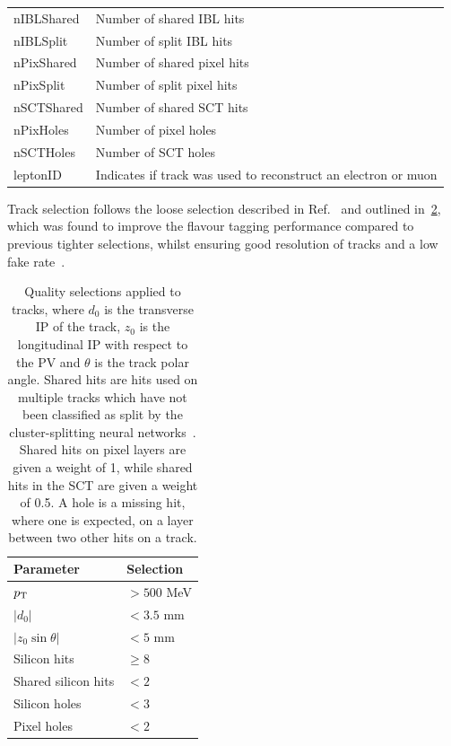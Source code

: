\begin{table}[!htbp]
\begin{tabular}{ll}
    nIBLShared & Number of shared IBL hits \\
    nIBLSplit  & Number of split IBL hits \\
    nPixShared & Number of shared pixel hits \\
    nPixSplit  & Number of split pixel hits \\
    nSCTShared & Number of shared SCT hits \\
    nPixHoles  & Number of pixel holes \\
    nSCTHoles  & Number of SCT holes \\
    leptonID   & Indicates if track was used to reconstruct an electron or muon \\
    \bottomrule
  \end{tabular}
  \vspace{4mm}
  \label{tab:track_inputs}
\end{table}


Track selection follows the loose selection described in Ref.~\cite{ATL-PHYS-PUB-2020-014} and outlined in~\cref{tab:track_selections}, which was found to improve the flavour tagging performance compared to previous tighter selections, whilst ensuring good resolution of tracks and a low fake rate~\cite{PERF-2015-08}.

\begin{table}[!htbp]
  \footnotesize\centering
  \setlength{\tabcolsep}{0.5em} %
  \begin{tabular}{ll}
    \toprule 
    \textbf{Parameter} & \textbf{Selection} \\
    \hline
    $p_{\text{T}}$                & $> 500$ MeV \\
    $|d_0|$              & $< 3.5$ mm \\
    $|z_0 \sin\theta|$   & $< 5$ mm \\
    Silicon hits         & $\ge 8$ \\
    Shared silicon hits  & $< 2$ \\
    Silicon holes        & $< 3$ \\
    Pixel holes          & $< 2$ \\
    \bottomrule
  \end{tabular}
  \caption{
    Quality selections applied to tracks,
    where $d_0$ is the transverse IP of the track, $z_0$ is the longitudinal IP with respect to the PV and $\theta$ is the track polar angle.
    Shared hits are hits used on multiple tracks which have not been classified as split by the cluster-splitting neural networks~\cite{PERF-2015-08}.
    Shared hits on pixel layers are given a weight of 1, while shared hits in the SCT are given a weight of 0.5.
    A hole is a missing hit, where one is expected, on a layer between two other hits on a track.
    }
  \vspace{4mm}
  \label{tab:track_selections}
\end{table}



